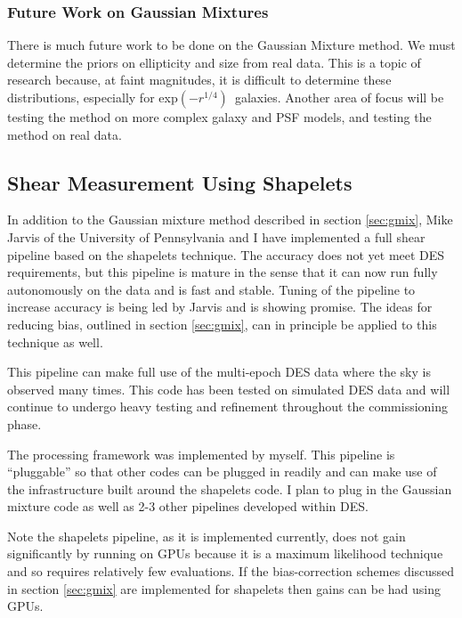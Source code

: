 \documentclass[12pt]{article}
\newcommand{\devprof}{exp$(-r^{1/4})$}
\begin{document}
\subsubsection{Future Work on Gaussian Mixtures}

There is much future work to be done on the Gaussian Mixture method.  We must
determine the priors on ellipticity and size from real data.  This is a topic
of research because, at faint magnitudes, it is difficult to determine these
distributions, especially for \devprof\ galaxies\cite{Miller12}.  Another area
of focus will be testing the method on more complex galaxy and PSF models, and
testing the method on real data.


\subsection{Shear Measurement Using Shapelets}
\label{sec:shapelets}

In addition to the Gaussian mixture method described in section \ref{sec:gmix},
Mike Jarvis of the University of Pennsylvania and I have implemented a full
shear pipeline based on the shapelets technique\cite{Bern02}.   The accuracy
does not yet meet DES requirements, but this pipeline is mature in the sense
that it can now run fully autonomously on the data and is fast and stable.
Tuning of the pipeline to increase accuracy is being led by Jarvis and is
showing promise.   The ideas for reducing bias, outlined in section
\ref{sec:gmix}, can in principle be applied to this technique as well.

This pipeline can make full use of the multi-epoch DES data where the sky is
observed many times.  This code has been tested on simulated DES data and will
continue to undergo heavy testing and refinement throughout the commissioning
phase.  

The processing framework was implemented by myself.  This pipeline is
``pluggable'' so that other codes can be plugged in readily and can make use of
the infrastructure built around the shapelets code.  I plan to plug in the
Gaussian mixture code as well as 2-3 other pipelines developed within DES.

Note the shapelets pipeline, as it is implemented currently, does not gain
significantly by running on GPUs because it is a maximum likelihood technique
and so requires relatively few evaluations.  If the bias-correction schemes
discussed in section \ref{sec:gmix} are implemented for shapelets then
gains can be had using GPUs.
\end{document}
